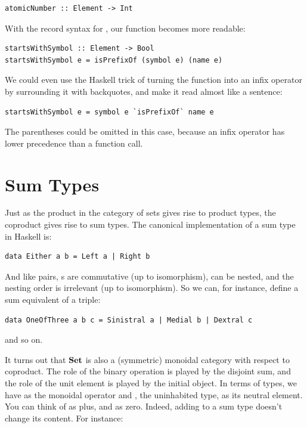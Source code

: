 \begin{Verbatim}
atomicNumber :: Element -> Int
\end{Verbatim}
With the record syntax for , our function
 becomes more readable:

\begin{Verbatim}
startsWithSymbol :: Element -> Bool
startsWithSymbol e = isPrefixOf (symbol e) (name e)
\end{Verbatim}
We could even use the Haskell trick of turning the function
 into an infix operator by surrounding it with
backquotes, and make it read almost like a sentence:

\begin{Verbatim}
startsWithSymbol e = symbol e `isPrefixOf` name e
\end{Verbatim}
The parentheses could be omitted in this case, because an infix operator
has lower precedence than a function call.

\section{Sum Types}\label{sum-types}

Just as the product in the category of sets gives rise to product types,
the coproduct gives rise to sum types. The canonical implementation of a
sum type in Haskell is:

\begin{Verbatim}
data Either a b = Left a | Right b
\end{Verbatim}
And like pairs, s are commutative (up to isomorphism),
can be nested, and the nesting order is irrelevant (up to isomorphism).
So we can, for instance, define a sum equivalent of a triple:

\begin{Verbatim}
data OneOfThree a b c = Sinistral a | Medial b | Dextral c
\end{Verbatim}
and so on.

It turns out that $\mathbf{Set}$ is also a (symmetric) monoidal category
with respect to coproduct. The role of the binary operation is played by
the disjoint sum, and the role of the unit element is played by the
initial object. In terms of types, we have  as the
monoidal operator and , the uninhabited type, as its
neutral element. You can think of  as plus, and
 as zero. Indeed, adding  to a sum type
doesn't change its content. For instance:

